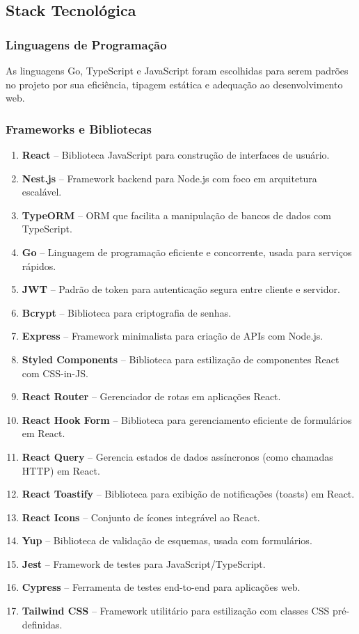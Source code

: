 \documentclass[12pt, a4paper]{article}
\begin{document}
\subsection{Stack Tecnológica}
\begin{spacing}{1.5}
\subsubsection{Linguagens de Programação}
As linguagens Go, TypeScript e JavaScript foram escolhidas para serem padrões no projeto por sua eficiência, tipagem estática e adequação ao desenvolvimento web.


\subsubsection{Frameworks e Bibliotecas}
\begin{enumerate}[label=\alph*)]
\item \textbf{React} – Biblioteca JavaScript para construção de interfaces de usuário.
\item \textbf{Nest.js} – Framework backend para Node.js com foco em arquitetura escalável.
\item \textbf{TypeORM} – ORM que facilita a manipulação de bancos de dados com TypeScript.
\item \textbf{Go} – Linguagem de programação eficiente e concorrente, usada para serviços rápidos.
\item \textbf{JWT} – Padrão de token para autenticação segura entre cliente e servidor.
\item \textbf{Bcrypt} – Biblioteca para criptografia de senhas.
\item \textbf{Express} – Framework minimalista para criação de APIs com Node.js.
\item \textbf{Styled Components} – Biblioteca para estilização de componentes React com CSS-in-JS.
\item \textbf{React Router} – Gerenciador de rotas em aplicações React.
\item \textbf{React Hook Form} – Biblioteca para gerenciamento eficiente de formulários em React.
\item \textbf{React Query} – Gerencia estados de dados assíncronos (como chamadas HTTP) em React.
\item \textbf{React Toastify} – Biblioteca para exibição de notificações (toasts) em React.
\item \textbf{React Icons} – Conjunto de ícones integrável ao React.
\item \textbf{Yup} – Biblioteca de validação de esquemas, usada com formulários.
\item \textbf{Jest} – Framework de testes para JavaScript/TypeScript.
\item \textbf{Cypress} – Ferramenta de testes end-to-end para aplicações web.
\item \textbf{Tailwind CSS} – Framework utilitário para estilização com classes CSS pré-definidas.
\end{enumerate}




\end{spacing}
\end{document}
